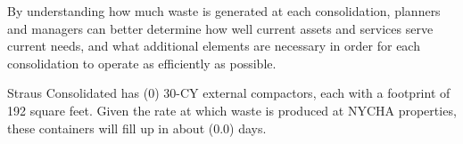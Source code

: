 
    By understanding how much waste is generated at each consolidation, planners and managers
    can better determine how well current assets and services serve current needs, and what additional 
    elements are necessary in order for each consolidation to operate as efficiently as possible. 

    Straus Consolidated has (0) 30-CY external compactors, each with a footprint of 192 square feet. Given the rate at which waste is produced at NYCHA properties, these containers will fill
    up in about (0.0) days.